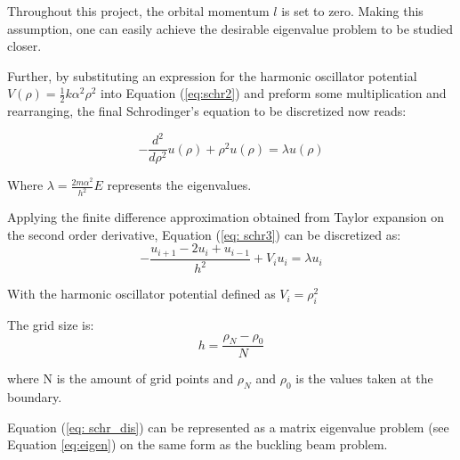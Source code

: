 \documentclass{article}
\begin{document}
\medskip

Throughout this project, the orbital momentum $l$ is set to zero. Making this assumption, one can easily achieve the desirable eigenvalue problem to be studied closer. 

\medskip

Further, by substituting an expression for the harmonic oscillator potential $V(\rho) = \frac{1}{2}k\alpha^2\rho^2$ into Equation (\ref{eq:schr2}) and preform some multiplication and rearranging, the final Schrodinger's equation to be discretized now reads:

\begin{equation}
-\frac{d^2}{d\rho^2}u(\rho) + \rho^2u(\rho) = \lambda u(\rho)
\label{eq: schr3}
\end{equation}

Where $\lambda = \frac{2m\alpha^2}{h^2}E$ represents the eigenvalues.

\medskip

Applying the finite difference approximation obtained from Taylor expansion on the second order derivative, Equation (\ref{eq: schr3}) can be discretized as:
\begin{equation}
    -\frac{u_{i+1}-2u_{i} + u_{i-1}}{h^2} 
    + V_iu_i = \lambda u_i
\label{eq: schr_dis}
\end{equation}

With the harmonic oscillator potential defined as $V_i = \rho_i^2$

\medskip

The grid size is:
\begin{equation}
    h = \frac{\rho_N-\rho_0}{N}
\end{equation}

where N is the amount of grid points and $\rho_N$ and $\rho_0$ is the values taken at the boundary. 

\medskip

Equation (\ref{eq: schr_dis}) can be represented as a matrix eigenvalue problem (see Equation \ref{eq:eigen}) on the same form as the buckling beam problem.
\end{document}
